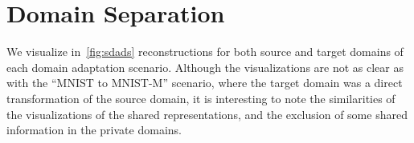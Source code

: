 \documentclass{article}
\begin{document}
\section{Domain Separation}
We visualize in~\autoref{fig:sdads} reconstructions for both source and target domains of each domain adaptation scenario. Although the visualizations are not as clear as with the ``MNIST to MNIST-M'' scenario, where the target domain was a direct transformation of the source domain, it is interesting to note the similarities of the visualizations of the shared representations, and the exclusion of some shared information in the private domains.

\newcommand{\subfigscale}{0.24}

\begin{figure}[ht]
    \centering
    

\end{figure}
\end{document}
